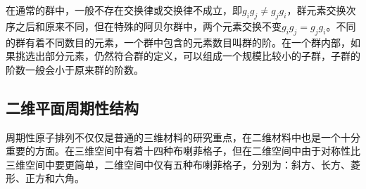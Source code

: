 在通常的群中，一般不存在交换律或交换律不成立，即$g_{i}g_{j} \neq g_{j}g_{i}$，群元素交换次序之后和原来不同，但在特殊的阿贝尔群中，两个元素交换不变$g_{i}g_{j} = g_{j}g_{i}$。不同的群有着不同数目的元素，一个群中包含的元素数目叫群的阶。在一个群内部，如果挑选出部分元素，仍然符合群的定义，可以组成一个规模比较小的子群，子群的阶数一般会小于原来群的阶数。

\subsection{二维平面周期性结构}

周期性原子排列不仅仅是普通的三维材料的研究重点，在二维材料中也是一个十分重要的方面。在三维空间中有着十四种布喇菲格子，但在二维空间中由于对称性比三维空间中要更简单，二维空间中仅有五种布喇菲格子，分别为：斜方、长方、菱形、正方和六角。


